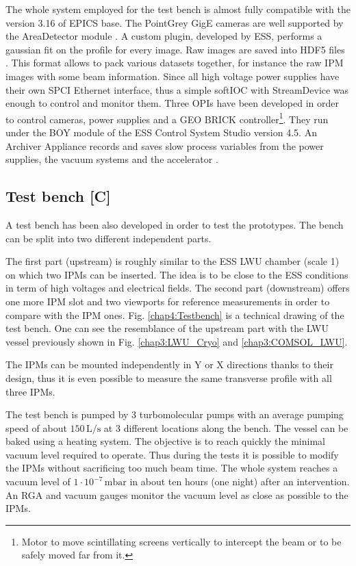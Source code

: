 \begin{refsection}
  The whole system employed for the test bench is almost fully compatible with the version 3.16 of EPICS base. The PointGrey GigE cameras are well supported by the AreaDetector module \cite{ad2019}. A custom plugin, developed by ESS, performs a gaussian fit on the profile for every image. Raw images are saved into HDF5 files \cite{hdf5}. This format allows to pack  various datasets together, for instance the raw IPM images with some beam information.
  Since all high voltage power supplies have their own SPCI Ethernet interface, thus a simple softIOC with StreamDevice\cite{streamdevice2019} was enough to control and monitor them.
  Three OPIs have been developed in order to control cameras, power supplies and a GEO BRICK controller\footnote{Motor to move scintillating screens vertically to intercept the beam or to be safely moved far from it.}. They run under the BOY module of the ESS Control System Studio version 4.5. An Archiver Appliance records and saves slow process variables from the power supplies, the vacuum systems and the accelerator \cite{archiver2019}.


  

  \subsection{Test bench [C]}
  A test bench has been also developed in order to test the prototypes. The bench can be split into two different independent parts.

  The first part (upstream) is roughly similar to the ESS LWU chamber (scale 1) on which two IPMs can be inserted. The idea is to be close to the ESS conditions in term of high voltages and electrical fields. The second part (downstream) offers one more IPM slot and two viewports for reference measurements in order to compare with the IPM ones. Fig. \ref{chap4:Testbench} is a technical drawing of the test bench. One can see the resemblance of the upstream part with the LWU vessel previously shown in Fig. \ref{chap3:LWU_Cryo} and \ref{chap3:COMSOL_LWU}.


  The IPMs can be mounted independently in Y or X directions thanks to their design, thus it is even possible to measure the same transverse profile with all three IPMs.

  

  The test bench is pumped by 3 turbomolecular pumps with an average pumping speed of about $150\,\mathrm{L/s}$ at 3 different locations along the bench. The vessel can be baked using a heating system. The objective is to reach quickly the minimal vacuum level required to operate. Thus during the tests it is possible to modify the IPMs without sacrificing too much beam time. The whole system reaches a vacuum level of $1\cdot 10^{-7}\,\mathrm{mbar}$ in about ten hours (one night) after an intervention. An RGA and vacuum gauges monitor the vacuum level as close as possible to the IPMs.


\end{refsection}
